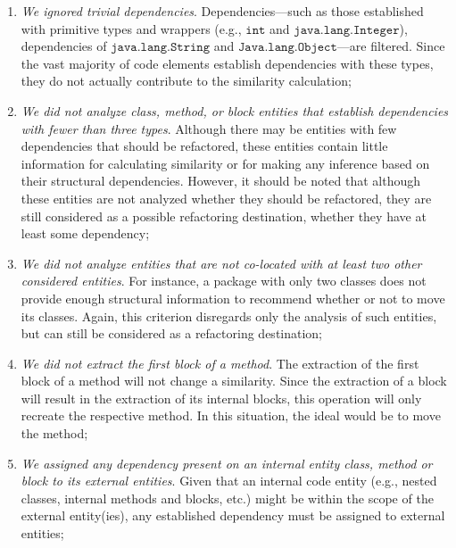 \documentclass[smallextended,natbib]{svjour3}
\newcommand{\mcode}[1]{{$\mathtt{#1}$}}
\begin{document}
{\begin{enumerate}
    \item \textit{We ignored trivial dependencies}. Dependencies---such as those established with primitive types and wrappers (e.g., \mcode{int} and \mcode{java.lang.Integer}), dependencies of \mcode{java.lang.String} and \mcode{Java.lang.Object}---are filtered. Since the vast majority of code elements establish dependencies with these types, they do not actually contribute to the similarity calculation;\\[-0.2cm]
    
    \item \textit{We did not analyze class, method, or block entities that establish dependencies with fewer than three types}. Although there may be entities with few dependencies that should be refactored, these entities contain little information for calculating similarity or for making any inference based on their structural dependencies. However, it should be noted that although these entities are not analyzed whether they should be refactored, they are still considered as a possible refactoring destination, whether they have at least some dependency;\\[-0.2cm]
    
    \item \textit{We did not analyze entities that are not co-located with at least two other considered entities}. For instance, a package with only two classes does not provide enough structural information to recommend whether or not to move its classes. Again, this criterion disregards only the analysis of such entities, but can still be considered as a refactoring destination;\\[-0.2cm]
    
    \item \textit{We did not extract the first block of a method}. The extraction of the first block of a method will not change a similarity. Since the extraction of a block will result in the extraction of its internal blocks, this operation will only recreate the respective method. In this situation, the ideal would be to move the method;\\[-0.2cm]
    
    \item \textit{We assigned any dependency present on an internal entity class, method or block to its external entities}. Given that an internal code entity (e.g., nested classes, internal methods and blocks, etc.) might be within the scope of the external entity(ies), any established dependency must be assigned to external entities;\\[-0.2cm]
    

\end{enumerate}}
\end{document}
